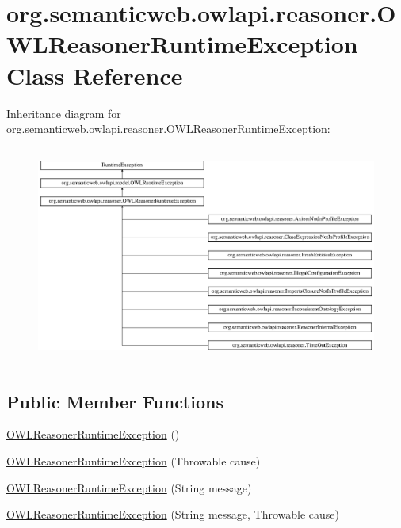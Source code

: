 \hypertarget{classorg_1_1semanticweb_1_1owlapi_1_1reasoner_1_1_o_w_l_reasoner_runtime_exception}{\section{org.\-semanticweb.\-owlapi.\-reasoner.\-O\-W\-L\-Reasoner\-Runtime\-Exception Class Reference}
\label{classorg_1_1semanticweb_1_1owlapi_1_1reasoner_1_1_o_w_l_reasoner_runtime_exception}
}
Inheritance diagram for org.\-semanticweb.\-owlapi.\-reasoner.\-O\-W\-L\-Reasoner\-Runtime\-Exception\-:\begin{figure}[H]
\begin{center}
\leavevmode
\includegraphics[height=7.196262cm]{classorg_1_1semanticweb_1_1owlapi_1_1reasoner_1_1_o_w_l_reasoner_runtime_exception}
\end{center}
\end{figure}
\subsection*{Public Member Functions}
\begin{DoxyCompactItemize}
\item 
\hyperlink{classorg_1_1semanticweb_1_1owlapi_1_1reasoner_1_1_o_w_l_reasoner_runtime_exception_a8d90c660ad6f34f3c4f5adbf000838b1}{O\-W\-L\-Reasoner\-Runtime\-Exception} ()
\item 
\hyperlink{classorg_1_1semanticweb_1_1owlapi_1_1reasoner_1_1_o_w_l_reasoner_runtime_exception_abeb62830643357d663664f97de629961}{O\-W\-L\-Reasoner\-Runtime\-Exception} (Throwable cause)
\item 
\hyperlink{classorg_1_1semanticweb_1_1owlapi_1_1reasoner_1_1_o_w_l_reasoner_runtime_exception_a0727601d17dcc1ca6b96638f96a167f0}{O\-W\-L\-Reasoner\-Runtime\-Exception} (String message)
\item 
\hyperlink{classorg_1_1semanticweb_1_1owlapi_1_1reasoner_1_1_o_w_l_reasoner_runtime_exception_a3a736d39445479cd77f5662209e05576}{O\-W\-L\-Reasoner\-Runtime\-Exception} (String message, Throwable cause)
\end{DoxyCompactItemize}
